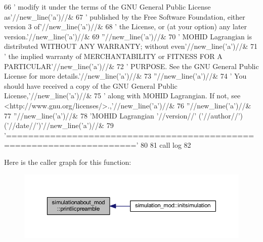 \begin{DoxyCode}
66         \textcolor{stringliteral}{'  modify it under the terms of the GNU General Public License as'}//new\_line(\textcolor{stringliteral}{'a'})//&
67         \textcolor{stringliteral}{'  published by the Free Software Foundation, either version 3 of'}//new\_line(\textcolor{stringliteral}{'a'})//&
68         \textcolor{stringliteral}{'  the License, or (at your option) any later version.'}//new\_line(\textcolor{stringliteral}{'a'})//&
69         \textcolor{stringliteral}{''}//new\_line(\textcolor{stringliteral}{'a'})//&
70         \textcolor{stringliteral}{'  MOHID Lagrangian is distributed WITHOUT ANY WARRANTY; without even'}//new\_line(\textcolor{stringliteral}{'a'})//&
71         \textcolor{stringliteral}{'  the implied warranty of MERCHANTABILITY or FITNESS FOR A PARTICULAR'}//new\_line(\textcolor{stringliteral}{'a'})//&
72         \textcolor{stringliteral}{'  PURPOSE. See the GNU General Public License for more details.'}//new\_line(\textcolor{stringliteral}{'a'})//&
73         \textcolor{stringliteral}{''}//new\_line(\textcolor{stringliteral}{'a'})//&
74         \textcolor{stringliteral}{'  You should have received a copy of the GNU General Public License,'}//new\_line(\textcolor{stringliteral}{'a'})//&
75         \textcolor{stringliteral}{'  along with MOHID Lagrangian. If not, see <http://www.gnu.org/licenses/>.,'}//new\_line(\textcolor{stringliteral}{'a'})//&
76         \textcolor{stringliteral}{''}//new\_line(\textcolor{stringliteral}{'a'})//&
77         \textcolor{stringliteral}{''}//new\_line(\textcolor{stringliteral}{'a'})//&
78         \textcolor{stringliteral}{'MOHID Lagrangian '}//version//\textcolor{stringliteral}{' ('}//author//\textcolor{stringliteral}{') ('}//date//\textcolor{stringliteral}{')'}//new\_line(\textcolor{stringliteral}{'a'})//&
79         \textcolor{stringliteral}{'====================================================================='}
80 
81     \textcolor{keyword}{call }log%
82 
\end{DoxyCode}
Here is the caller graph for this function\+:\nopagebreak
\begin{figure}[H]
\begin{center}
\leavevmode
\includegraphics[width=350pt]{namespacesimulationabout__mod_a4248c37e1b337cda7226a41aac346761_icgraph}
\end{center}
\end{figure}



